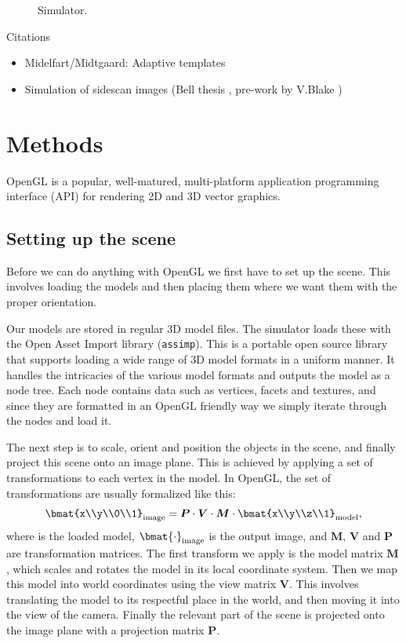 \documentclass[
   UAM                                          %
 , 12pt                                         %
 , bibtex                                       %
 , layout
]{common/mytemplate}
\newcommand\mat[1]{\boldsymbol{#1}}
\renewcommand*\P{\mat P}
\newcommand*\V{\mat V}
\newcommand*\M{\mat M}
\begin{document}
\begin{figure}[t]\centering%
%
\caption{Simulator.}\label{buildup}%
\end{figure}

Citations
\begin{itemize}
\item Midelfart/Midtgaard: Adaptive templates \cite{Midelfart2010}
\item Simulation of sidescan images (Bell thesis \cite{Bell1997}, pre-work by V.Blake \cite{Blake1993})
\end{itemize}


\section{Methods}


OpenGL is a popular, well-matured, multi-platform application programming interface (API) for rendering 2D and 3D vector graphics. 

\subsection{Setting up the scene}

Before we can do anything with OpenGL we first have to set up the scene. This involves loading the models and then placing them where we want them with the proper orientation. 

Our models are stored in regular 3D model files. The simulator loads these with the Open Asset Import library (\texttt{assimp}). This is a portable open source library that supports loading a wide range of 3D model formats in a uniform manner. It handles the intricacies of the various model formats and outputs the model as a node tree. Each node contains data such as vertices, facets and textures, and since they are formatted in an OpenGL friendly way we simply iterate through the nodes and load it.

The next step is to scale, orient and position the objects in the scene, and finally project this scene onto an image plane. This is achieved by applying a set of transformations to each vertex in the model. In OpenGL, the set of transformations are usually formalized like this:
\begin{align*}
\bmat{x\\y\\0\\1}_\text{image} = \P \cdot \V \cdot \M \cdot \bmat{x\\y\\z\\1}_\text{model},
\end{align*}
where is the loaded model, $\bmat{\cdot}_\text{image}$ is the output image, and $\M$, $\V$ and $\P$ are transformation matrices. The first transform we apply is the model matrix $\M$, which scales and rotates the model in its local coordinate system. Then we map this model into world coordinates using the view matrix $\V$. This involves translating the model to its respectful place in the world, and then moving it into the view of the camera. Finally the relevant part of the scene is projected onto the image plane with a projection matrix $\P$. 
\end{document}

